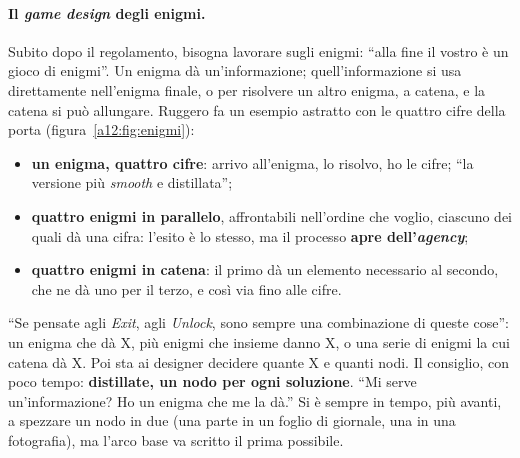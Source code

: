\paragraph{Il \emph{game design} degli enigmi.} Subito dopo il regolamento, bisogna lavorare
sugli enigmi: ``alla fine il vostro è un gioco di enigmi''. Un enigma dà
un'informazione; quell'informazione si usa direttamente nell'enigma finale, o per
risolvere un altro enigma, a catena, e la catena si può allungare. Ruggero fa un esempio
astratto con le quattro cifre della porta (figura~\ref{a12:fig:enigmi}):
\begin{itemize}
  \item \textbf{un enigma, quattro cifre}: arrivo all'enigma, lo risolvo, ho le cifre; ``la
        versione più \emph{smooth} e distillata'';
  \item \textbf{quattro enigmi in parallelo}, affrontabili nell'ordine che voglio,
        ciascuno dei quali dà una cifra: l'esito è lo stesso, ma il processo \textbf{apre
        dell'\emph{agency}};
  \item \textbf{quattro enigmi in catena}: il primo dà un elemento necessario al secondo,
        che ne dà uno per il terzo, e così via fino alle cifre.
\end{itemize}
``Se pensate agli \emph{Exit}, agli \emph{Unlock}, sono sempre una combinazione di queste
cose'': un enigma che dà X, più enigmi che insieme danno X, o una serie di enigmi la cui
catena dà X. Poi sta ai designer decidere quante X e quanti nodi. Il consiglio, con poco
tempo: \textbf{distillate, un nodo per ogni soluzione}. ``Mi serve un'informazione? Ho un
enigma che me la dà.'' Si è sempre in tempo, più avanti, a spezzare un nodo in due (una
parte in un foglio di giornale, una in una fotografia), ma l'arco base va scritto il prima
possibile.


